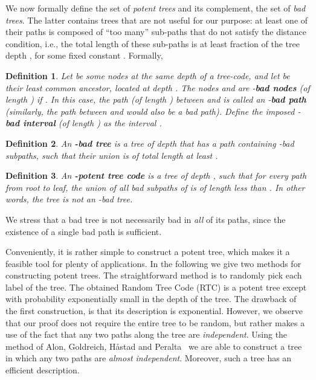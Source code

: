 \documentclass[ letterpaper, 11pt]{article}
\newtheorem{definition}{Definition}
\newcommand{\potent}{potent\xspace}
\newcommand{\RTBC}{\textsf{RTC}\xspace}
\begin{document}
We now formally define the set of \emph{\potent trees} and its complement,
the set of \emph{bad trees}. The latter contains trees that are not useful for our purpose:
at least one of their paths is composed of
``too many'' sub-paths that do not satisfy the distance condition, i.e.,
the total length of these sub-paths
is at least  fraction of the tree depth , for some fixed constant . Formally,
\begin{definition}\label{def:badNode}
Let  be some nodes at the same depth  of a tree-code, and let
 be their least common ancestor, located at depth .
The nodes  and  are
-\textbf{bad nodes} (of length )
if .
In this case, the path (of length ) between  and  is called an -\textbf{bad path} (similarly, the path between  and  would also be a bad path).
Define the imposed -\textbf{bad interval} (of length )
as the interval .
\end{definition}



\begin{definition}\label{def:badTree}
An \textbf{-bad tree}
is a tree of depth 
that has a path containing -bad subpaths, such that their
union is of total length at least .
\end{definition}
\begin{definition}
An  \textbf{-\potent tree code}  is a tree of depth ,
such that for every path  from root to leaf,
the union of all bad subpaths of  is of length less than .
In other words,  the tree is \emph{not} an -bad tree.
\end{definition}
\noindent We stress that a bad tree is not necessarily bad in \emph{all} of its paths,
since the existence of a single bad path is sufficient.

Conveniently, it is rather simple to construct a \potent tree,
which makes it a feasible
tool for plenty of applications.
In the following we give two methods for constructing \potent trees.
The straightforward method is to randomly pick each label of the tree.
The obtained Random Tree Code (\RTBC) is a potent tree except with probability
exponentially small in the depth of the tree.
The drawback of the first construction, is that its description is exponential.
However, we observe that our proof does not require the entire tree to be random,
but rather makes a use of the fact that any two paths along the tree are \emph{independent}.
Using the method of Alon, Goldreich, H{\aa}stad and Peralta~\cite{AGHP92}
we are able to construct a  tree in which any two paths are \emph{almost independent}.
Moreover, such a tree has an efficient description.
\end{document}
